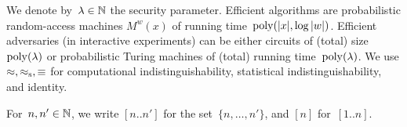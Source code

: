 We denote by~${\lambda\in{\mathbb{N}}}$ the security parameter.
Efficient algorithms are probabilistic random-access machines $M^w(x)$ of running time~$\operatorname{poly}(|x|,\log|w|)$.
Efficient adversaries (in interactive experiments) can be either circuits of (total) size~$\operatorname{poly}(\lambda)$ or probabilistic Turing machines of (total) running time~$\operatorname{poly}(\lambda)$.
We use $\approx,\approx_{\textup{s}},\equiv$ for computational indistinguishability, statistical indistinguishability, and identity.

For~${n,n'\in{\mathbb{N}}}$, we write $[n..n']$ for the set~$\{n,\dots,n'\}$,
and $[n]$ for~$[1..n]$.
